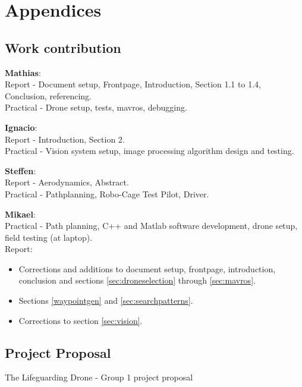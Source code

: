 \part*{Appendices}
\appendix
\chapter{Work contribution}
\label{app:work}
\textbf{Mathias}:\\
Report - Document setup, Frontpage,  Introduction, Section  1.1 to 1.4, Conclusion, referencing.\\
Practical - Drone setup, tests, mavros, debugging.

\textbf{Ignacio}:\\
Report - Introduction, Section  2.\\
Practical - Vision system setup, image processing algorithm design and testing.

\textbf{Steffen}:\\
Report - Aerodynamics, Abstract.\\
Practical - Pathplanning, 
Robo-Cage Test Pilot, Driver.

\textbf{Mikael}:\\
Practical - Path planning, C++ and Matlab software development, drone setup, field testing (at laptop).\\
Report:
\begin{itemize}
\item Corrections and additions to document setup, frontpage, introduction, conclusion and sections \ref{sec:droneselection} through \ref{sec:mavros}.
\item Sections \ref{waypointgen} and \ref{sec:searchpatterns}.
\item Corrections to section \ref{sec:vision}.
\end{itemize}

\newpage

\chapter{Project Proposal}
\label{app:projectproposal}
The Lifeguarding Drone - Group 1 project proposal\\
